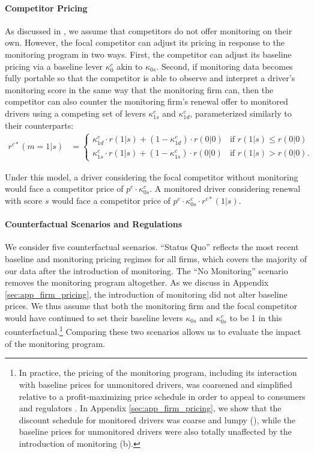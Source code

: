 \paragraph{Competitor Pricing} As discussed in , we assume that competitors do not offer monitoring on their own. However, the focal competitor can adjust its pricing in response to the monitoring program in two ways. First, the competitor can adjust its baseline pricing via a baseline lever $\kappa^c_0$ akin to $\kappa_{0s}$. Second, if monitoring data becomes fully portable so that the competitor is able to observe and interpret a driver's monitoring score in the same way that the monitoring firm can, then  the competitor can also counter the monitoring firm's renewal offer to monitored drivers using a competing set of levers $\kappa^c_{1s}$ and $\kappa^c_{1d}$, parameterized similarly to their counterparts:
\begin{align*}
r^{c\ast}(m=1|s) & =
\begin{cases}
\kappa^c_{1d} \cdot r(1|s) + (1- \kappa^c_{1d}) \cdot r(0|0) & \text{if }r(1|s)\leq r(0|0)\\
\kappa^c_{1s} \cdot r(1|s) + (1- \kappa^c_{1s}) \cdot r(0|0) & \text{if }r(1|s)>r(0|0).
\end{cases}
\end{align*}

Under this model, a driver considering the focal competitor without monitoring would face a competitor price of $p^c \cdot \kappa^c_{0s}$. A monitored driver considering renewal with score $s$ would face a competitor price of $p^c \cdot \kappa^c_{0s} \cdot r^{c\ast}(1|s)$.

\paragraph{Counterfactual Scenarios and Regulations} We consider five counterfactual scenarios. ``Status Quo'' reflects the most recent baseline and monitoring pricing regimes for all firms, which covers the majority of our data after the introduction of monitoring.
The ``No Monitoring'' scenario removes the monitoring program altogether. As we discuss in Appendix \ref{sec:app_firm_pricing}, the introduction of monitoring did not alter baseline prices. We thus assume that both the monitoring firm and the focal competitor would have continued to set their baseline levers $\kappa_{0s}$ and $\kappa^c_{0s}$ to be 1 in this counterfactual.\footnote{In practice, the pricing of the monitoring program, including its interaction with baseline prices for unmonitored drivers, was coarsened and simplified relative to a profit-maximizing price schedule in order to appeal to consumers and regulators \parencite{ben2023privacy}. In Appendix \ref{sec:app_firm_pricing}, we show that the discount schedule for monitored drivers was coarse and lumpy (), while the baseline prices for unmonitored drivers were also totally unaffected by the introduction of monitoring (b).} Comparing these two scenarios allows us to evaluate the impact of the monitoring program.

